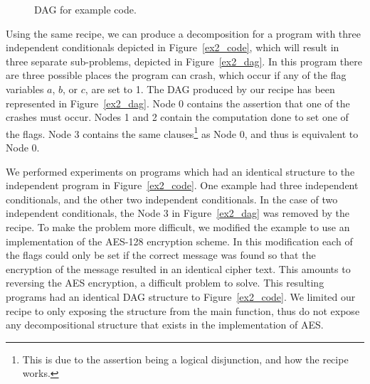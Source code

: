 \documentclass[
10pt, %
a4paper, %
oneside, %
headinclude,footinclude, %
BCOR5mm, %
]{scrartcl}
\begin{document}
\begin{figure}[h]
\centering
{}
  \caption{DAG for example code.}
  \label{ex1_dag}
\end{figure}

Using the same recipe, we can produce a decomposition for a program with three independent conditionals depicted in Figure~\ref{ex2_code}, which will result in three separate sub-problems, depicted in Figure~\ref{ex2_dag}.
In this program there are three possible places the program can crash, which occur if any of the flag variables $a$, $b$, or $c$, are set to 1.
The DAG produced by our recipe has been represented in Figure~\ref{ex2_dag}. Node 0 contains the assertion that one of the crashes must occur.
Nodes 1 and 2 contain the computation done to set one of the flags.
Node 3 contains the same clauses\footnote{This is due to the assertion being a logical disjunction, and how the recipe works.} as Node 0, and thus is equivalent to Node 0.

We performed experiments on programs which had an identical structure to the independent program in Figure~\ref{ex2_code}.
One example had three independent conditionals, and the other two independent conditionals.
In the case of two independent conditionals, the Node 3 in Figure~\ref{ex2_dag} was removed by the recipe.
To make the problem more difficult, we modified the example to use an implementation of the AES-128 encryption scheme.
In this modification each of the flags could only be set if the correct message was found so that the encryption of the message resulted in an identical cipher text.
This amounts to reversing the AES encryption, a difficult problem to solve. This resulting programs had an identical DAG structure to Figure~\ref{ex2_code}.
We limited our recipe to only exposing the structure from the main function, thus do not expose any decompositional structure that exists in the implementation of AES.
\end{document}
